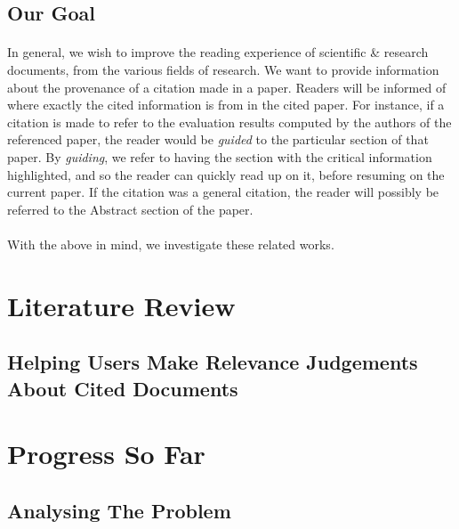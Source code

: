 \documentclass[12 pt]{article}
\begin{document}
\subsection{Our Goal}
\paragraph{}
In general, we wish to improve the reading experience of scientific \& research documents, from the various fields of research. We want to provide information about the provenance of a citation made in a paper. Readers will be informed of where exactly the cited information is from in the cited paper. For instance, if a citation is made to refer to the evaluation results computed by the authors of the referenced paper, the reader would be \textit{guided} to the particular section of that paper. By \textit{guiding}, we refer to having the section with the critical information highlighted, and so the reader can quickly read up on it, before resuming on the current paper. If the citation was a general citation, the reader will possibly be referred to the Abstract section of the paper.

\paragraph{}
With the above in mind, we investigate these related works.

\section{Literature Review}
\subsection{Helping Users Make Relevance Judgements About Cited Documents}


\section{Progress So Far}
\subsection{Analysing The Problem}
\end{document}
